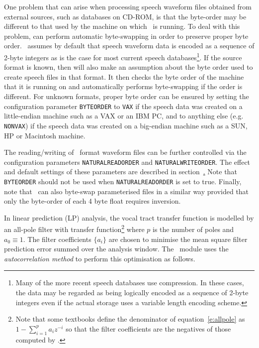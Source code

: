 One problem that can arise when processing speech waveform files obtained from
external sources, such as databases on CD-ROM, is that the
byte-order may be different to that used by the machine on
which \HTK\ is running. To deal with this problem,  can perform
automatic byte-swapping in order to preserve proper byte order. \HTK\ assumes
by default that speech waveform data is encoded as a sequence of 2-byte
integers as is the case for most current speech databases\footnote{Many of the
more recent speech databases use compression. In these cases, the data may be
regarded as being logically encoded as a sequence of 2-byte integers even if
the actual storage uses a variable length encoding scheme.}. 
If the source format is known, then  will also make an assumption
about the byte order used to create speech files in that format. It then checks
the byte order of the machine that it is running on and automatically performs
byte-swapping if the order is different. For unknown formats, proper byte order
can be ensured by setting the configuration parameter
\texttt{BYTEORDER} to \texttt{VAX} if the
speech data was created on a little-endian machine such as a VAX or an IBM PC,
and to anything else (e.g. \texttt{NONVAX}) if the speech data was created on a
big-endian machine such as a SUN, HP or Macintosh machine.  

The reading/writing of \HTK\ format waveform files can be further controlled
via the configuration parameters \texttt{NATURALREADORDER} and 
\texttt{NATURALWRITEORDER}. The effect and default settings of these parameters
are described in section~\href{s:byteswap}.
Note that \texttt{BYTEORDER} should not be used when \texttt{NATURALREADORDER}
is set to true.  Finally, note that \HTK\ can also byte-swap parameterised
files in a similar way provided that only the byte-order of each 4 byte float
requires inversion.  


In linear prediction (LP)  analysis, the 
vocal tract transfer function
is modelled by an all-pole filter with transfer function\footnote{
Note that some textbooks define the denominator of equation~\ref{e:allpole}
as $1 - \sum_{i=1}^p a_i z^{-i}$ so that the filter coefficients are the
negatives of those computed by \HTK.}
where $p$ is the number of poles and $a_0 \equiv 1$.
The filter coefficients $\{a_i \}$ are chosen to minimise
the mean square filter prediction error summed over the analysis
window.  The \HTK\ module  uses the \textit{autocorrelation
method} to perform this optimisation as follows.

